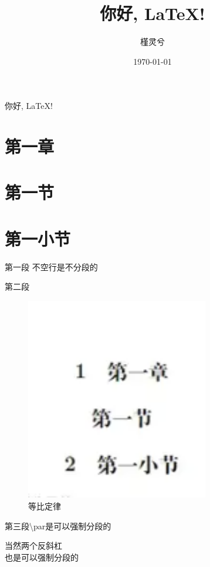\documentclass[UTF8]{ctexart}
\title{你好, LaTeX!}
\author{槿灵兮}
\date{\today}
\begin{document}
\maketitle

\tableofcontents

你好, LaTeX!

\section{第一章}

\section*{第一节}

\section{第一小节}
第一段
不空行是不分段的

第二段

\begin{figure}[htbp]
    \centering
    \includegraphics[width=8cm]{tu1.png}
    \caption{等比定律}
\end{figure}

第三段\textbackslash par是可以强制分段的 %

当然两个反斜杠\\也是可以强制分段的
\end{document}
